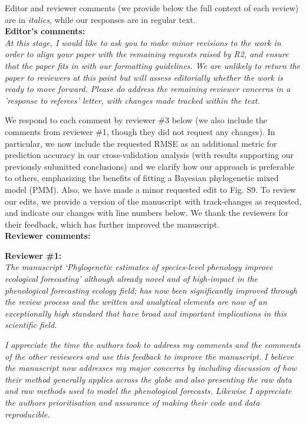 \documentclass[11pt]{article}
\begin{document}
Editor and reviewer comments (we provide below the full context of each review) are in \emph{italics}, while our responses are in regular text. 
\\ %

{\bf Editor's comments:} \\


\emph{At this stage, I would like to ask you to make minor revisions to the work in order to align your paper with the remaining requests raised by R2, and ensure that the paper fits in with our formatting guidelines. We are unlikely to return the paper to reviewers at this point but will assess editorially whether the work is ready to move forward. Please do address the remaining reviewer concerns in a 'response to referees' letter, with changes made tracked within the text.}

We respond to each comment by reviewer \#3 below (we also include the comments from reviewer \#1, though they did not request any changes). In particular, we now include the requested RMSE as an additional metric for prediction accuracy in our cross-validation analysis (with results supporting our previously submitted conclusions) and we clarify how our approach is preferable to others, emphasizing the benefits of fitting a Bayesian phylogenetic mixed model (PMM). Also, we have made a minor requested edit to Fig. S9. To review our edits, we provide a version of the manuscript with track-changes as requested, and indicate our changes with line numbers below. We thank the reviewers for their feedback, which has further improved the manuscript.\\

{\bf Reviewer comments:} 

{\bf Reviewer \#1:}\\

\emph{The manuscript ‘Phylogenetic estimates of species-level phenology improve ecological forecasting’ although already novel and of high-impact in the phenological forecasting ecology field; has now been significantly improved through the review process and the written and analytical elements are now of an exceptionally high standard that have broad and important implications in this scientific field.}

\emph{I appreciate the time the authors took to address my comments and the comments of the other reviewers and use this feedback to improve the manuscript. I believe the manuscript now addresses my major concerns by including discussion of how their method generally applies across the globe and also presenting the raw data and raw methods used to model the phenological forecasts. Likewise I appreciate the authors prioritisation and assurance of making their code and data reproducible.}
\end{document}
